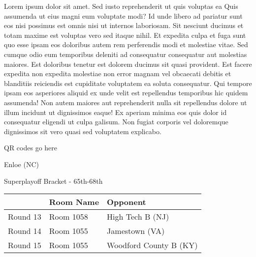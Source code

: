 \documentclass{article}%
\begin{document}
\vspace*{8pt}%
\linebreak%
\newline%
\newline%
Lorem ipsum dolor sit amet. Sed iusto reprehenderit ut quis voluptas ea Quis assumenda ut eius magni eum voluptate modi? Id unde libero ad pariatur sunt eos nisi possimus est omnis nisi ut internos laboriosam. Sit nesciunt ducimus et totam maxime est voluptas vero sed itaque nihil. Et expedita culpa et fuga sunt quo esse ipsam eos doloribus autem rem perferendis modi et molestiae vitae.\newline%
\newline%
Sed cumque odio eum temporibus deleniti ad consequatur consequatur aut molestias maiores. Est doloribus tenetur est dolorem ducimus sit quasi provident. Est facere expedita non expedita molestiae non error magnam vel obcaecati debitis et blanditiis reiciendis est cupiditate voluptatem ea soluta consequatur. Qui tempore ipsam eos asperiores aliquid ex unde velit est repellendus temporibus hic quidem assumenda!\newline%
\newline%
Non autem maiores aut reprehenderit nulla sit repellendus dolore ut illum incidunt ut dignissimos eaque! Ex aperiam minima eos quis dolor id consequatur eligendi ut culpa galisum. Non fugiat corporis vel doloremque dignissimos sit vero quasi sed voluptatem explicabo.\newline%
\newline%
%
\vspace*{30pt}%
\begin{center}%
\begin{Huge}%
QR codes go here%
\end{Huge}%
\end{center}%
\newpage%
\begin{center}%
\begin{Huge}%
Enloe (NC)%
\end{Huge}%
\vspace*{8pt}%
\linebreak%
\begin{Large}%
Superplayoff Bracket {-} 65th{-}68th%
\end{Large}%
\end{center}%
%
\begin{tabularx}{\textwidth}{|c|Y|Y|}%
\hline%
&Room Name&Opponent\\%
\hline%
Round 13&Room 1058&High Tech B (NJ)\\%
Round 14&Room 1055&Jamestown (VA)\\%
Round 15&Room 1055&Woodford County B (KY)\\%
\hline%
\end{tabularx}%
\end{document}
